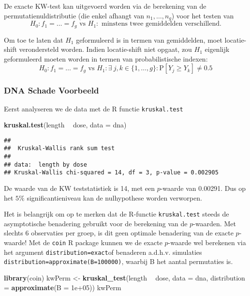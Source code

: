 \documentclass[12pt,dutch,coursenotes]{book}
\newenvironment{Shaded}{\begin{snugshade}}{\end{snugshade}}
\newcommand{\KeywordTok}[1]{\textcolor[rgb]{0.13,0.29,0.53}{\textbf{#1}}}
\newcommand{\DataTypeTok}[1]{\textcolor[rgb]{0.13,0.29,0.53}{#1}}
\newcommand{\FloatTok}[1]{\textcolor[rgb]{0.00,0.00,0.81}{#1}}
\newcommand{\StringTok}[1]{\textcolor[rgb]{0.31,0.60,0.02}{#1}}
\newcommand{\OperatorTok}[1]{\textcolor[rgb]{0.81,0.36,0.00}{\textbf{#1}}}
\newcommand{\NormalTok}[1]{#1}
\theoremstyle{definition}
\theoremstyle{definition}
\theoremstyle{definition}
\theoremstyle{remark}
\begin{document}
De exacte KW-test kan uitgevoerd worden via de berekening van de
permutatienuldistributie (die enkel afhangt van \(n_1, \ldots, n_g\))
voor het testen van
\[H_0: f_1=\ldots=f_g \text{ vs } H_1: \text{ minstens twee gemiddelden verschillend}.\]

Om toe te laten dat \(H_1\) geformuleerd is in termen van gemiddelden,
moet locatie-shift verondersteld worden. Indien locatie-shift niet
opgaat, zou \(H_1\) eigenlijk geformuleerd moeten worden in termen van
probabilistische indexen:
\[H_0: f_1=\ldots=f_g \text{ vs } H_1: \exists\ j,k \in \{1,\ldots,g\} : \text{P}\left[Y_j\geq Y_k\right]\neq 0.5\]

\subsubsection{DNA Schade Voorbeeld}\label{dna-schade-voorbeeld}

Eerst analyseren we de data met de R functie \texttt{kruskal.test}

\begin{Shaded}
\begin{Highlighting}[]
\KeywordTok{kruskal.test}\NormalTok{(length }\OperatorTok{~}\StringTok{ }\NormalTok{dose, }\DataTypeTok{data =}\NormalTok{ dna)}
\end{Highlighting}
\end{Shaded}

\begin{verbatim}
## 
##  Kruskal-Wallis rank sum test
## 
## data:  length by dose
## Kruskal-Wallis chi-squared = 14, df = 3, p-value = 0.002905
\end{verbatim}

De waarde van de KW teststatistiek is 14, met een \(p\)-waarde van
0.00291. Dus op het \(5\%\) significantieniveau kan de nulhypothese
worden verworpen.

Het is belangrijk om op te merken dat de R-functie \texttt{kruskal.test}
steeds de asymptotische benadering gebruikt voor de berekening van de
\(p\)-waarden. Met slechts 6 observaties per groep, is dit geen optimale
benadering van de exacte \(p\)-waarde! Met de \texttt{coin} R package
kunnen we de exacte \(p\)-waarde wel berekenen via het argument
\texttt{distribution=\textquotesingle{}exact\textquotesingle{}}of
benaderen a.d.h.v. simulaties
\texttt{distribution=approximate(B=100000)}, waarbij B het aantal
permutaties is.

\begin{Shaded}
\begin{Highlighting}[]
\KeywordTok{library}\NormalTok{(coin)}
\NormalTok{kwPerm <-}\StringTok{ }\KeywordTok{kruskal_test}\NormalTok{(length }\OperatorTok{~}\StringTok{ }\NormalTok{dose, }\DataTypeTok{data =}\NormalTok{ dna, }\DataTypeTok{distribution =} \KeywordTok{approximate}\NormalTok{(}\DataTypeTok{B =} \FloatTok{1e+05}\NormalTok{))}
\NormalTok{kwPerm}
\end{Highlighting}
\end{Shaded}
\end{document}
